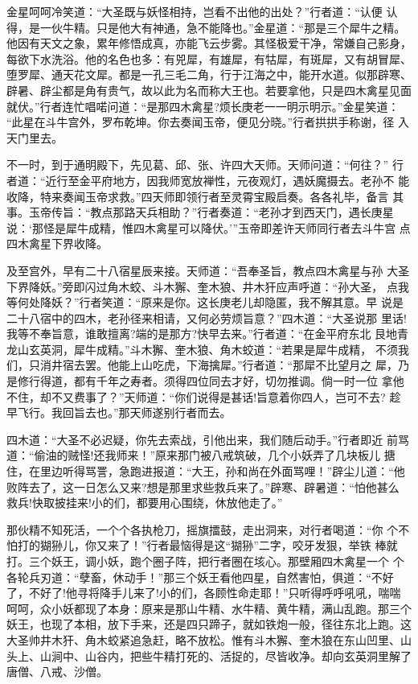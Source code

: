 金星呵呵冷笑道：“大圣既与妖怪相持，岂看不出他的出处？”行者道：“认便
认得，是一伙牛精。只是他大有神通，急不能降也。”金星道：“那是三个犀牛之精。
他因有天文之象，累年修悟成真，亦能飞云步雾。其怪极爱干净，常嫌自己影身，
每欲下水洗浴。他的名色也多：有兕犀，有雄犀，有牯犀，有斑犀，又有胡冒犀、
堕罗犀、通天花文犀。都是一孔三毛二角，行于江海之中，能开水道。似那辟寒、
辟暑、辟尘都是角有贵气，故以此为名而称大王也。若要拿他，只是四木禽星见面
就伏。”行者连忙唱喏问道：“是那四木禽星?烦长庚老一一明示明示。”金星笑道：
“此星在斗牛宫外，罗布乾坤。你去奏闻玉帝，便见分晓。”行者拱拱手称谢，径
入天门里去。

不一时，到于通明殿下，先见葛、邱、张、许四大天师。天师问道：“何往？”
行者道：“近行至金平府地方，因我师宽放禅性，元夜观灯，遇妖魔摄去。老孙不
能收降，特来奏闻玉帝求救。”四天师即领行者至灵霄宝殿启奏。各各礼毕，备言
其事。玉帝传旨：“教点那路天兵相助？”行者奏道：“老孙才到西天门，遇长庚星
说：‘那怪是犀牛成精，惟四木禽星可以降伏。’”玉帝即差许天师同行者去斗牛宫
点四木禽星下界收降。

及至宫外，早有二十八宿星辰来接。天师道：“吾奉圣旨，教点四木禽星与孙
大圣下界降妖。”旁即闪过角木蛟、斗木獬、奎木狼、井木犴应声呼道：“孙大圣，
点我等何处降妖？”行者笑道：“原来是你。这长庚老儿却隐匿，我不解其意。早
说是二十八宿中的四木，老孙径来相请，又何必劳烦旨意？”四木道：“大圣说那
里话!我等不奉旨意，谁敢擅离?端的是那方?快早去来。”行者道：“在金平府东北
艮地青龙山玄英洞，犀牛成精。”斗木獬、奎木狼、角木蛟道：“若果是犀牛成精，
不须我们，只消井宿去罢。他能上山吃虎，下海擒犀。”行者道：“那犀不比望月之
犀，乃是修行得道，都有千年之寿者。须得四位同去才好，切勿推调。倘一时一位
拿他不住，却不又费事了？”天师道：“你们说得是甚话!旨意着你四人，岂可不去?
趁早飞行。我回旨去也。”那天师遂别行者而去。

四木道：“大圣不必迟疑，你先去索战，引他出来，我们随后动手。”行者即近
前骂道：“偷油的贼怪!还我师来！”原来那门被八戒筑破，几个小妖弄了几块板儿
搪住，在里边听得骂詈，急跑进报道：“大王，孙和尚在外面骂哩！”辟尘儿道：“他
败阵去了，这一日怎么又来?想是那里求些救兵来了。”辟寒、辟暑道：“怕他甚么
救兵!快取披挂来!小的们，都要用心围绕，休放他走了。”

那伙精不知死活，一个个各执枪刀，摇旗擂鼓，走出洞来，对行者喝道：“你
个不怕打的猢狲儿，你又来了！”行者最恼得是这“猢狲”二字，咬牙发狠，举铁
棒就打。三个妖王，调小妖，跑个圈子阵，把行者圈在垓心。那壁厢四木禽星一个
个各轮兵刃道：“孽畜，休动手！”那三个妖王看他四星，自然害怕，俱道：“不好
了，不好了!他寻将降手儿来了!小的们，各顾性命走耶！”只听得呼呼吼吼，喘喘
呵呵，众小妖都现了本身：原来是那山牛精、水牛精、黄牛精，满山乱跑。那三个
妖王，也现了本相，放下手来，还是四只蹄子，就如铁炮一般，径往东北上跑。这
大圣帅井木犴、角木蛟紧追急赶，略不放松。惟有斗木獬、奎木狼在东山凹里、山
头上、山涧中、山谷内，把些牛精打死的、活捉的，尽皆收净。却向玄英洞里解了
唐僧、八戒、沙僧。

